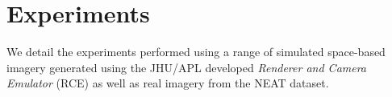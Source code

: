 \section{Experiments}
%
%
%
%
%

\label{sec:experiments}

We detail the experiments performed using a range of simulated space-based imagery generated using the JHU/APL developed {\em Renderer and Camera Emulator} (RCE) as well as real imagery from the NEAT dataset.  


